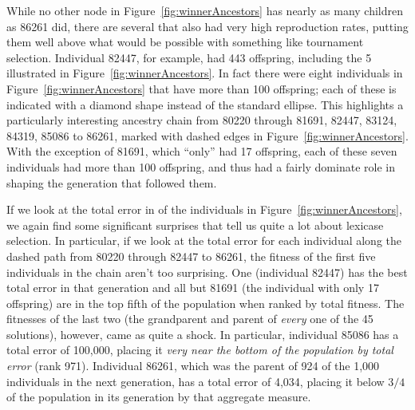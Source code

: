 
While no other node in Figure~\ref{fig:winnerAncestors} has nearly as many children as 86261 did,
there are several that also had very high reproduction rates, putting them well above what would be 
possible with something like tournament selection. Individual 82447, for example, had
443 offspring, including the 5 illustrated in Figure~\ref{fig:winnerAncestors}. In fact there were
eight individuals in Figure~\ref{fig:winnerAncestors} that have more than 100 offspring; each of
these is indicated with a diamond shape instead of the standard ellipse. This highlights a particularly
interesting ancestry chain from 80220 through 81691, 82447, 83124, 84319, 85086 to 86261, marked with
dashed edges in Figure~\ref{fig:winnerAncestors}. With the exception of 81691, which ``only'' had 17
offspring, each of these seven individuals had more
than 100 offspring, and thus had a fairly dominate role in shaping the generation that followed them. 

If we look at the total error in of the individuals in Figure~\ref{fig:winnerAncestors}, we again
find some significant surprises that tell us quite a lot about lexicase selection. In particular, if
we look at the total error for each individual along the dashed path from 80220 through
82447 to 86261, the fitness of the first five
individuals in the chain aren't too surprising. One (individual 82447) has the best total error in
that generation and all but 81691 (the individual with only 17 offspring) are in the top fifth of the 
population when ranked by total fitness. The fitnesses 
of the last two (the grandparent and parent of \emph{every} one of the 45 solutions), however, 
came as quite a shock. In particular, individual 85086 has a total error of 100,000, placing it
\emph{very near the bottom of the population by total error} (rank 971). Individual 86261, which was
the parent of 924 of the 1,000 individuals in the next generation, has a total error of 4,034, placing
it below $3/4$ of the population in its generation by that aggregate measure.

